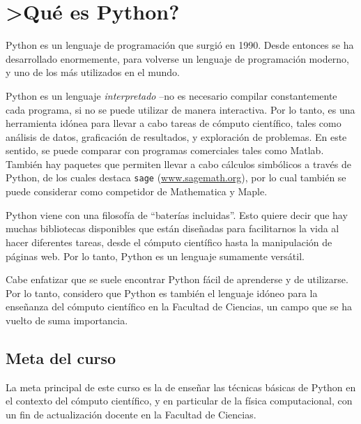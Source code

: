 \chapter{>Qué es Python?}

Python es un lenguaje de programación que surgió en 1990. Desde entonces se ha desarrollado enormemente, para volverse un lenguaje de programación 
moderno, y uno de los más utilizados en el mundo.

Python es un lenguaje \emph{interpretado} --no es necesario compilar constantemente cada programa, si no se puede utilizar de manera interactiva.
Por lo tanto, es una herramienta idónea para llevar a cabo tareas de cómputo científico, tales como análisis de datos, graficación de resultados, y exploración de problemas. En este sentido, se puede comparar con programas comerciales tales como Matlab. También hay paquetes que permiten llevar a cabo cálculos simbólicos a través de Python, de los cuales destaca \texttt{sage}  (\url{www.sagemath.org}), por lo cual también se puede considerar como competidor de Mathematica y Maple.

Python viene con una filosofía de ``baterías incluidas''. Esto quiere decir que hay muchas bibliotecas disponibles que están diseñadas para facilitarnos la vida al hacer diferentes tareas, desde el cómputo científico hasta la manipulación de páginas web. Por lo tanto, Python es un lenguaje sumamente versátil.

Cabe enfatizar que se suele encontrar Python fácil de aprenderse y de utilizarse. Por lo tanto, considero que Python es también el lenguaje idóneo para la enseñanza del cómputo científico en la Facultad de Ciencias, un campo que se ha vuelto de suma importancia.

\section{Meta del curso}
La meta principal de este curso es la de enseñar las técnicas básicas de Python en el contexto del cómputo científico, y en particular de la física computacional,
con un fin de actualización docente en la Facultad de Ciencias.